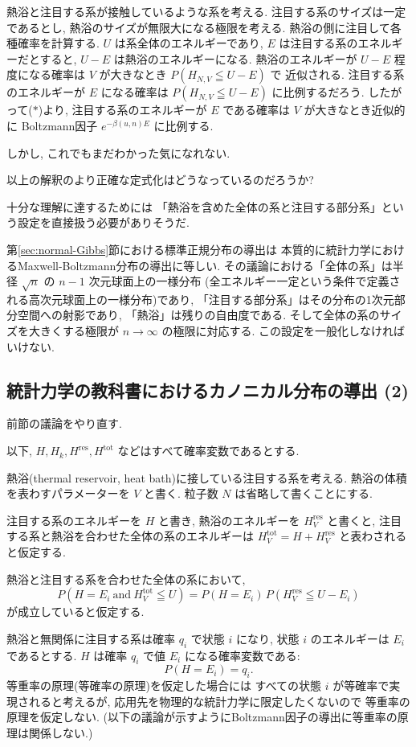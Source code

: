 \documentclass[12pt,twoside]{jarticle}
\newcommand\Hres{H^{\operatorname{res}}}
\newcommand\Htot{H^{\operatorname{tot}}}
\theoremstyle{jplain}
\theoremstyle{jplain}
\theoremstyle{jplain}
\numberwithin{theorem}{section}
\numberwithin{equation}{section}
\numberwithin{figure}{section}
\numberwithin{table}{section}
\newcommand\secref[1]{第\ref{#1}節}
\begin{document}
熱浴と注目する系が接触しているような系を考える.
注目する系のサイズは一定であるとし, 熱浴のサイズが無限大になる極限を考える.
熱浴の側に注目して各種確率を計算する.
$U$ は系全体のエネルギーであり,
$E$ は注目する系のエネルギーだとすると,
$U-E$ は熱浴のエネルギーになる.
熱浴のエネルギーが $U-E$ 程度になる確率は $V$ が大きなとき $P(H_{N,V}\leqq U-E)$ で
近似される.
注目する系のエネルギーが $E$ になる確率は $P(H_{N,V}\leqq U-E)$ に比例するだろう.
したがって($*$)より,
注目する系のエネルギーが $E$ である確率は $V$ が大きなとき近似的に
Boltzmann因子 $e^{-\beta(u,n)E}$ に比例する.

しかし, これでもまだわかった気になれない.

以上の解釈のより正確な定式化はどうなっているのだろうか?

十分な理解に達するためには
「熱浴を含めた全体の系と注目する部分系」という設定を直接扱う必要がありそうだ.

\secref{sec:normal-Gibbs}における標準正規分布の導出は
本質的に統計力学におけるMaxwell-Boltzmann分布の導出に等しい.
その議論における「全体の系」は半径 $\sqrt{n}$ の $n-1$ 次元球面上の一様分布
(全エネルギー一定という条件で定義される高次元球面上の一様分布)であり,
「注目する部分系」はその分布の1次元部分空間への射影であり,
「熱浴」は残りの自由度である.
そして全体の系のサイズを大きくする極限が $n\to\infty$ の極限に対応する.
この設定を一般化しなければいけない.


\subsection{統計力学の教科書におけるカノニカル分布の導出 (2)}
\label{sec:thermal-reservoir}

前節の議論をやり直す.

以下, $H,H_k,\Hres, \Htot$ などはすべて確率変数であるとする.

熱浴(thermal reservoir, heat bath)に接している注目する系を考える.
熱浴の体積を表わすパラメーターを $V$ と書く.
粒子数 $N$ は省略して書くことにする.

注目する系のエネルギーを $H$ と書き, 熱浴のエネルギーを $\Hres_V$ と書くと,
注目する系と熱浴を合わせた全体の系のエネルギーは $\Htot_V=H+\Hres_V$ と表わされる
と仮定する.

熱浴と注目する系を合わせた全体の系において,
\[
P(H=E_i\ \text{and}\ \Htot_V\leqq U)
=
P(H=E_i)\,P(\Hres_V\leqq U-E_i)
\tag{1}
\]
が成立していると仮定する.

熱浴と無関係に注目する系は確率 $q_i$ で状態 $i$ になり,
状態 $i$ のエネルギーは $E_i$ であるとする.
$H$ は確率 $q_i$ で値 $E_i$ になる確率変数である:
\[
P(H=E_i)=q_i.
\tag{2}
\]
等重率の原理(等確率の原理)を仮定した場合には
すべての状態 $i$ が等確率で実現されると考えるが,
応用先を物理的な統計力学に限定したくないので
等重率の原理を仮定しない.
(以下の議論が示すようにBoltzmann因子の導出に等重率の原理は関係しない.)
\end{document}
